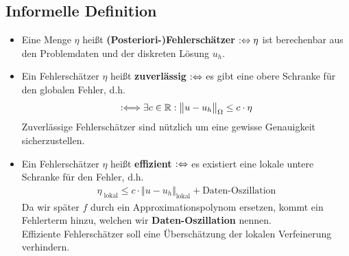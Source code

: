 \subsection*{Informelle Definition}
\begin{itemize}
	\item Eine Menge $\eta$ heißt \textbf{(Posteriori-)Fehlerschätzer} $:\Leftrightarrow\eta$ ist berechenbar aus den Problemdaten und der diskreten Lösung $u_h$.
	\item Ein Fehlerschätzer $\eta$ heißt \textbf{zuverlässig} $:\Leftrightarrow$ es gibt eine obere Schranke für den globalen Fehler, d.h.
	\begin{align*}
		:\Longleftrightarrow\exists c\in\mathbb{R}:\big\Vert u-u_h\big\Vert_\Omega\leq c\cdot\eta
	\end{align*}
	Zuverlässige Fehlerschätzer sind nützlich um eine gewisse Genauigkeit sicherzustellen.
	\item Ein Fehlerschätzer $\eta$ heißt \textbf{effizient} $:\Leftrightarrow$ es existiert eine lokale untere Schranke für den Fehler, d.h.
	\begin{align*}
		\eta_{\text{ lokal}}\leq c\cdot\big\Vert u-u_h\big\Vert_{\text{lokal}}+\text{Daten-Oszillation}
	\end{align*}
	Da wir später $f$ durch ein Approximationspolynom ersetzen, kommt ein Fehlerterm hinzu, welchen wir \textbf{Daten-Oszillation} nennen.\\
	Effiziente Fehlerschätzer soll eine Überschätzung der lokalen Verfeinerung verhindern.
\end{itemize}

